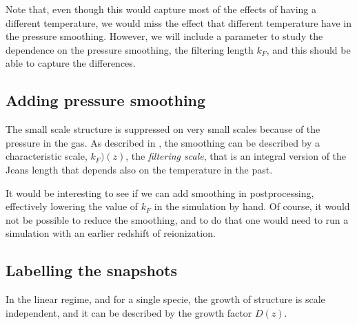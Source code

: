 Note that, even though this would capture most of the effects of having a 
different temperature, we would miss the effect that different temperature
have in the pressure smoothing.
However, we will include a parameter to study the dependence on the pressure
smoothing, the filtering length $k_F$, and this should be able to capture
the differences.


\subsection{Adding pressure smoothing}

The small scale structure is suppressed on very small scales because of the
pressure in the gas. 
As described in \cite{Hui1997,Gnedin1998}, the smoothing can be described
by a characteristic scale, $k_F)(z)$, the \textit{filtering scale}, that is
an integral version of the Jeans length that depends also on the temperature
in the past.

It would be interesting to see if we can add smoothing in postprocessing, 
effectively lowering the value of $k_F$ in the simulation by hand. 
Of course, it would not be possible to reduce the smoothing, and to do that 
one would need to run a simulation with an earlier redshift of reionization.



\subsection{Labelling the snapshots}

In the linear regime, and for a single specie, the growth of structure is 
scale independent, and it can be described by the growth factor $D(z)$.


